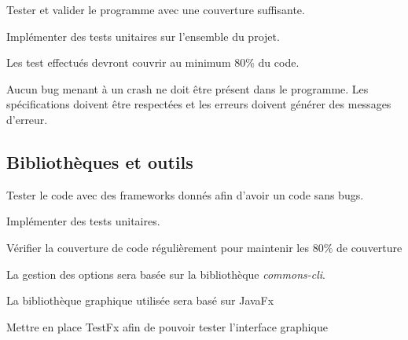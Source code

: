 \documentclass{article}
\begin{document}
\begin{nonfunctionnalneedbox}[F6. Tests]
    Tester et valider le programme avec une couverture suffisante.
    \begin{subneedbox}[F6.1 Tests]
        Implémenter des tests unitaires sur l'ensemble du projet.
    \end{subneedbox}

    \begin{subneedbox}[F6.2 Coverage]
        Les test effectués devront couvrir au minimum 80\% du code.
    \end{subneedbox}
\end{nonfunctionnalneedbox}

\begin{nonfunctionnalneedbox}[F7: Bugs]
    Aucun bug menant à un crash ne doit être présent dans le programme. Les spécifications doivent être respectées et les erreurs doivent générer des messages d'erreur.
\end{nonfunctionnalneedbox}

\subsection{Bibliothèques et outils}

\begin{nonfunctionnalneedbox}
    Tester le code avec des frameworks donnés afin d'avoir un code sans bugs.
    \begin{subneedbox}
        Implémenter des tests unitaires.
    \end{subneedbox}

    \begin{subneedbox}
        Vérifier la couverture de code régulièrement pour maintenir les 80\% de couverture
    \end{subneedbox}
\end{nonfunctionnalneedbox}

\begin{nonfunctionnalneedbox}
    La gestion des options sera basée sur la bibliothèque \textit{commons-cli}.
\end{nonfunctionnalneedbox}

\begin{nonfunctionnalneedbox}
    La bibliothèque graphique utilisée sera basé sur JavaFx
    \begin{subneedbox}
        Mettre en place TestFx afin de pouvoir tester l'interface graphique
    \end{subneedbox}
\end{nonfunctionnalneedbox}
\end{document}

